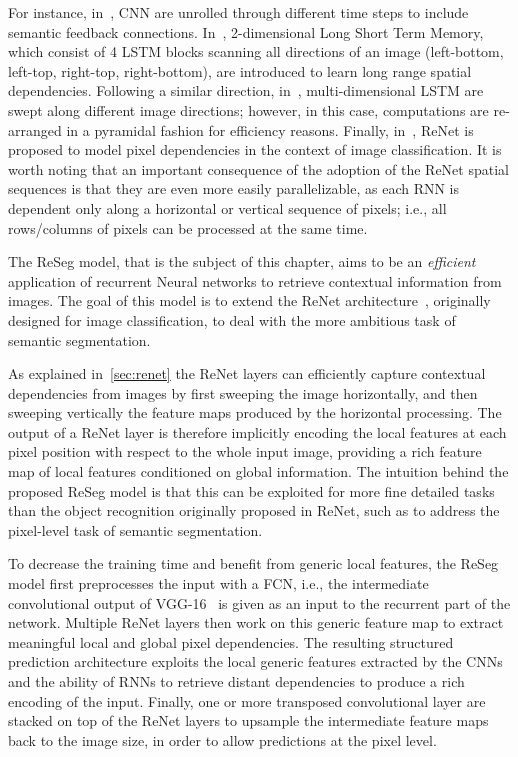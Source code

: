 For instance, in~\citep{Pinheiro:2014,Gatta14-deepvision}, CNN are
unrolled through different time steps to include semantic feedback connections.
In~\citep{byeon2015scene}, 2-dimensional Long Short Term Memory, which
consist of 4 LSTM blocks scanning all directions of an image (left-bottom,
left-top, right-top, right-bottom), are introduced to learn long range spatial
dependencies. Following a similar direction, in~\citep{stollenga2015parallel},
multi-dimensional LSTM are swept along different image directions; however, in
this case, computations are re-arranged in a pyramidal fashion for efficiency
reasons. Finally, in~\citep{visin2015renet}, ReNet is proposed to model pixel
dependencies in the context of image classification. It is worth noting that
an important consequence of the adoption of the ReNet spatial sequences is
that they are even more easily parallelizable, as each RNN is dependent only
along a horizontal or vertical sequence of pixels; i.e., all rows/columns of
pixels can be processed at the same time.

The ReSeg model, that is the subject of this chapter, aims to be an {\em
efficient} application of recurrent Neural networks to retrieve contextual
information from images. The goal of this model is to extend the ReNet
architecture~\citep{visin2015renet}, originally designed for image
classification, to deal with the more ambitious task of semantic segmentation.

As explained in~\autoref{sec:renet} the ReNet layers can efficiently
capture contextual dependencies from images by first sweeping the image
horizontally, and then sweeping vertically the feature maps produced by the
horizontal processing. The output of a ReNet layer is therefore implicitly
encoding the local features at each pixel position with respect to the whole
input image, providing a rich feature map of local features conditioned on
global information. The intuition behind the proposed ReSeg model is that this
can be exploited for more fine detailed tasks than the object recognition
originally proposed in ReNet, such as to address the pixel-level task of
semantic segmentation.

To decrease the training time and benefit from generic local features, the
ReSeg model first preprocesses the input with a FCN, i.e., the intermediate
convolutional output of VGG-16~\citep{Simonyan2015} is given as an input to the
recurrent part of the network. Multiple ReNet layers then work on this generic
feature map to extract meaningful local and global pixel dependencies.
The resulting structured prediction architecture exploits the local generic
features extracted by the CNNs and the ability of RNNs to retrieve distant
dependencies to produce a rich encoding of the input. Finally, one or more
transposed convolutional layer are stacked on top of the ReNet layers to
upsample the intermediate feature maps back to the image size, in order to
allow predictions at the pixel level.

